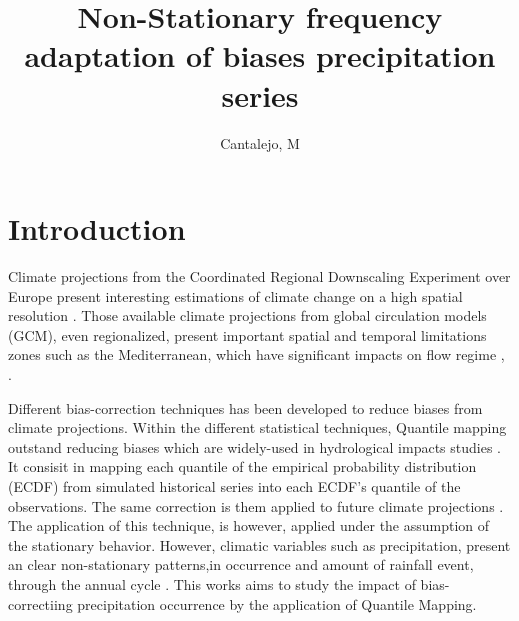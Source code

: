 \documentclass[a4paper,11pt]{article}
\begin{document}
\title{Non-Stationary frequency adaptation of biases precipitation series}
\author{Cantalejo, M}
\maketitle
{}



\section{Introduction}\label{sec1}
Climate projections from the Coordinated Regional Downscaling Experiment over Europe present interesting estimations of climate change on a high spatial resolution  \cite{bib1}. Those available climate projections  from global circulation models (GCM), even regionalized, present important spatial and temporal limitations zones such as the Mediterranean, which have significant impacts on flow regime \cite{bib2} , \cite{bib3}.

Different bias-correction techniques has been developed to reduce biases from climate projections. Within the different statistical techniques, Quantile mapping outstand reducing biases which are widely-used in hydrological impacts studies \cite{bib4}. It consisit in mapping each quantile of the empirical probability distribution (ECDF) from simulated historical series into each ECDF's quantile of the observations. The same correction is them applied to future climate projections \cite{bib5}. The application of this technique, is however, applied under the assumption of the stationary behavior. However, climatic variables such as precipitation, present an clear non-stationary patterns,in occurrence and amount of rainfall event, through the annual cycle \cite{bib6}. This works aims to study the impact of bias-correctiing precipitation occurrence by the application of Quantile Mapping. 
\end{document}
